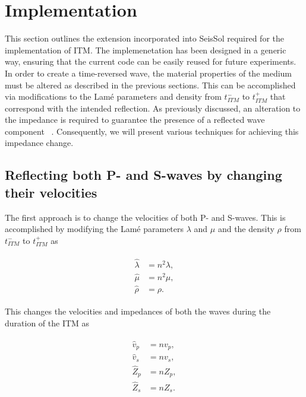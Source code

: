 \section{Implementation}\label{section:Implementation}

This section outlines the extension incorporated into SeisSol required for the implementation of \ac{ITM}. The implemenetation has been designed in a generic way,
ensuring that the current code can be easily reused for future experiments. \\

In order to create a time-reversed wave, the material properties of the medium must be altered as described in the previous sections. This can be accomplished via
modifications to the Lam\'{e} parameters and density from $t_{ITM}^-$ to $t_{ITM}^+$ that correspond with the intended reflection. As previously discussed, an alteration
to the impedance is required to guarantee the presence of a reflected wave component ~\parencite[Sec 9.8]{leveque_2002}. Consequently, we will present various techniques
for achieving this impedance change. \\

\subsection{Reflecting both P- and S-waves by changing their velocities}\label{sec:reflecting_both}

The first approach is to change the velocities of both P- and S-waves. This is accomplished by modifying the Lam\'{e} parameters $\lambda$ and $\mu$ and the density $\rho$ from $t_{ITM}^-$ to $t_{ITM}^+$ as

\begin{align}
    \begin{split}
        \hat{\lambda} &= n^2 \lambda , \\
        \hat{\mu} &= n^2 \mu ,\\
        \hat{\rho} &= \rho .
    \end{split}
\end{align}

This changes the velocities and impedances of both the waves during the duration of the \ac{ITM} as

\begin{align}
    \begin{split}
        \hat{v}_p &= n v_p ,\\
        \hat{v}_s &= n v_s ,\\
        \hat{Z}_p &= n Z_p ,\\
        \hat{Z}_s &= n Z_s .
    \end{split}
\end{align}

